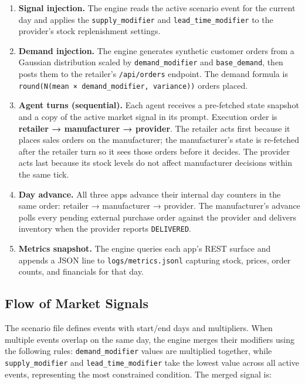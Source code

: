 \documentclass[
]{article}
\providecommand{\tightlist}{%
  \setlength{\itemsep}{0pt}\setlength{\parskip}{0pt}}
\begin{document}
\begin{enumerate}
\def\labelenumi{\arabic{enumi}.}
\tightlist
\item
  \textbf{Signal injection.} The engine reads the active scenario event
  for the current day and applies the \texttt{supply\_modifier} and
  \texttt{lead\_time\_modifier} to the provider's stock replenishment
  settings.
\item
  \textbf{Demand injection.} The engine generates synthetic customer
  orders from a Gaussian distribution scaled by
  \texttt{demand\_modifier} and \texttt{base\_demand}, then posts them
  to the retailer's \texttt{/api/orders} endpoint. The demand formula is
  \texttt{round(N(mean\ ×\ demand\_modifier,\ variance))} orders placed.
\item
  \textbf{Agent turns (sequential).} Each agent receives a pre-fetched
  state snapshot and a copy of the active market signal in its prompt.
  Execution order is \textbf{retailer → manufacturer → provider}. The
  retailer acts first because it places sales orders on the
  manufacturer; the manufacturer's state is re-fetched after the
  retailer turn so it sees those orders before it decides. The provider
  acts last because its stock levels do not affect manufacturer
  decisions within the same tick.
\item
  \textbf{Day advance.} All three apps advance their internal day
  counters in the same order: retailer → manufacturer → provider. The
  manufacturer's advance polls every pending external purchase order
  against the provider and delivers inventory when the provider reports
  \texttt{DELIVERED}.
\item
  \textbf{Metrics snapshot.} The engine queries each app's REST surface
  and appends a JSON line to \texttt{logs/metrics.jsonl} capturing
  stock, prices, order counts, and financials for that day.
\end{enumerate}

\subsection{Flow of Market Signals}\label{how-market-signals-flow}

The scenario file defines events with start/end days and multipliers.
When multiple events overlap on the same day, the engine merges their 
modifiers using the following rules: \texttt{demand\_modifier} values 
are multiplied together, while \texttt{supply\_modifier} and 
\texttt{lead\_time\_modifier} take the lowest value across all active 
events, representing the most constrained condition. The merged signal is:
\end{document}
